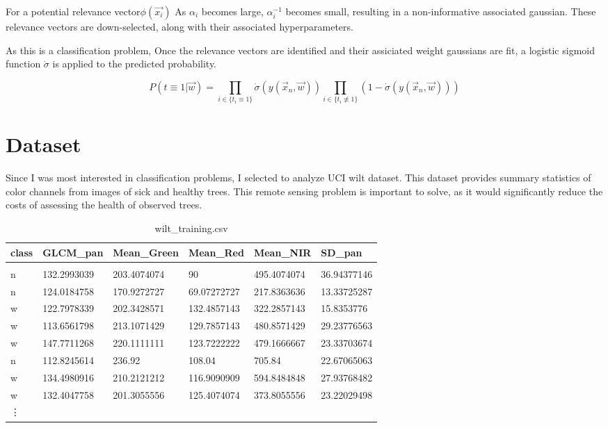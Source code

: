 \documentclass[11pt]{article} %
\def\rv{relevance vector\xspace}
\def\wilt{UCI wilt dataset\xspace}
\begin{document}
For a potential \rv $\phi(\vec{x_i})$ As $\alpha_i$ becomes large,
$\alpha_i^{-1}$ becomes small, resulting in a non-informative
associated gaussian. These \rv{}s are down-selected, along
with their associated hyperparameters.

As this is a classification problem, Once the \rv{}s are identified
and their assiciated weight gaussians are fit, a logistic sigmoid
function $\dot{\sigma}$ is applied to the predicted probability.

\[P(t\equiv 1|\vec{w}) = \prod_{i\in \{t_i \equiv 1\}}\dot{\sigma}(y(\vec{x}_n, \vec{w})) \prod_{i\in \{t_i \not\equiv 1\}}\left(1-\dot{\sigma}(y(\vec{x}_n, \vec{w}))\right)\]

\section{Dataset}
Since I was most interested in classification problems, I
selected to analyze \wilt. This dataset provides summary
statistics of color channels from images of sick and healthy
trees. This remote sensing problem is important to solve, as
it would significantly reduce the costs of assessing the
health of observed trees.

\begin{table}[!h]
\centering
\caption{wilt\_training.csv}
\label{wilt_training.csv}
\begin{tabular}{llllll}
  {\bf class} & {\bf GLCM\_pan}   & {\bf Mean\_Green} & {\bf Mean\_Red}   & {\bf Mean\_NIR}   & {\bf SD\_pan} \\\hline\\
n     & 132.2993039 & 203.4074074 & 90          & 495.4074074 & 36.94377146 \\
n     & 124.0184758 & 170.9272727 & 69.07272727 & 217.8363636 & 13.33725287 \\
w     & 122.7978339 & 202.3428571 & 132.4857143 & 322.2857143 & 15.8353776  \\
w     & 113.6561798 & 213.1071429 & 129.7857143 & 480.8571429 & 29.23776563 \\
w     & 147.7711268 & 220.1111111 & 123.7222222 & 479.1666667 & 23.33703674 \\
n     & 112.8245614 & 236.92      & 108.04      & 705.84      & 22.67065063 \\
w     & 134.4980916 & 210.2121212 & 116.9090909 & 594.8484848 & 27.93768482 \\
w     & 132.4047758 & 201.3055556 & 125.4074074 & 373.8055556 & 23.22029498 \\
\vdots
\end{tabular}
\end{table}
\end{document}
